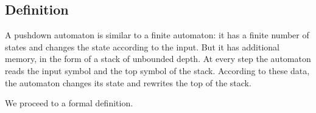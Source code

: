 \subsection{Definition}
A pushdown automaton is similar to a finite automaton:
it has a finite number of states and changes the state according to the input.
But it has additional memory, in the form of a stack of unbounded depth.
At every step the automaton reads the input symbol and the top symbol of the stack.
According to these data, the automaton changes its state and rewrites the top of the stack.

We proceed to a formal definition.